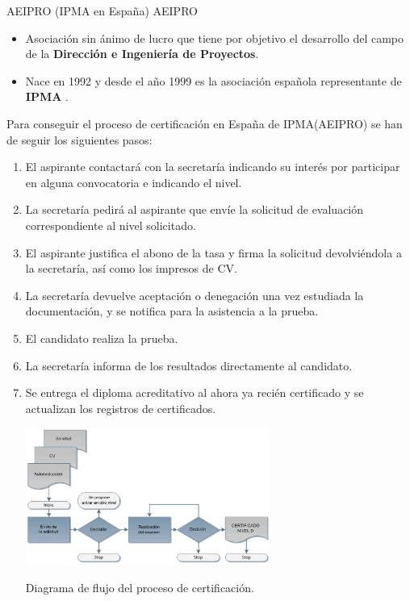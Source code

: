 \begin{frame}[allowframebreaks]{AEIPRO (IPMA en España)}
	AEIPRO 
	\begin{itemize}
		\item Asociación sin ánimo de lucro que tiene por objetivo el desarrollo del campo de la \textbf{Dirección e Ingeniería de Proyectos}.
		\item Nace en 1992 y desde el año 1999 es la asociación española representante de \textbf{IPMA} .
	\end{itemize}
	
	\framebreak
	
	Para conseguir el proceso de certificación en España de IPMA(AEIPRO) se han de seguir los siguientes pasos:
	
	\begin{enumerate}
		\item El aspirante contactará con la secretaría indicando su interés por participar en alguna convocatoria e indicando el nivel.
		\item La secretaría pedirá al aspirante que envíe la solicitud de evaluación correspondiente al nivel solicitado.
		\item El aspirante justifica el abono de la tasa y firma la solicitud devolviéndola a la secretaría, así como los impresos de CV.
		\framebreak
		\item La secretaría devuelve aceptación o denegación una vez estudiada la documentación, y se notifica para la asistencia a la prueba.
		\item El candidato realiza la prueba.
		\item La secretaría informa de los resultados directamente al candidato.
		\item Se entrega el diploma acreditativo al ahora ya recién certificado y se actualizan los registros de certificados.
		
		\framebreak
		
		\begin{center}
			\includegraphics[height=4.5cm]{figuras/procesod.png}
			
			Diagrama de flujo del proceso de certificación.
		\end{center}
		
	\end{enumerate}
	
\end{frame}
